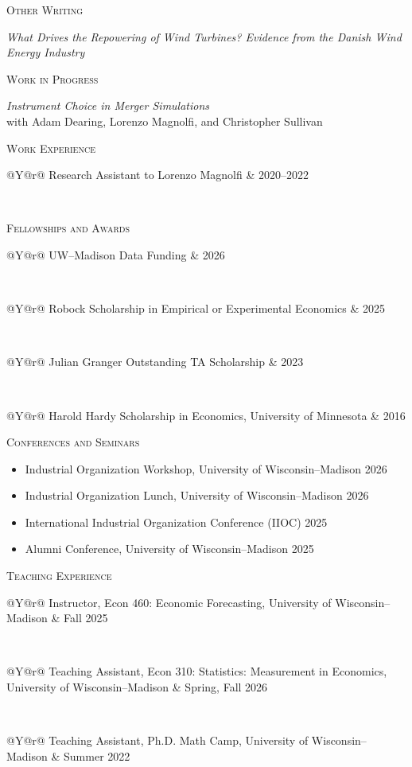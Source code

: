 \documentclass[11pt]{article}
\makeatletter
\newlength{\labelwidthcv}
\newlength{\labelgapcv}
\newlength{\contentwidthcv}
\newcommand{\sectionlabel}[1]{\textsc{#1}}
\newcommand{\vsp}{\vspace{0.20in}}
\newcommand{\papertitle}[1]{\textit{#1}}
\newcommand{\cvblock}[2]{%
  \noindent
  \begin{minipage}[t]{\labelwidthcv}
    \vspace{0pt}\raggedright\sectionlabel{#1}
  \end{minipage}%
  \hspace{\labelgapcv}%
  \begin{minipage}[t]{\contentwidthcv}
    \vspace{0pt}#2
  \end{minipage}\par
}
\newcommand{\datedentry}[2]{%
  \begin{tabularx}{\linewidth}{@{}Y@{\hspace{0.7em}}r@{}}
  #1 & #2
  \end{tabularx}%
}
\makeatother
\begin{document}
\vsp

\cvblock{Other Writing}{%
  \papertitle{What Drives the Repowering of Wind Turbines? Evidence from the Danish Wind Energy Industry}
}

\vsp

\cvblock{Work in Progress}{%
  \papertitle{Instrument Choice in Merger Simulations}\\[-0.01in]
  with Adam Dearing, Lorenzo Magnolfi, and Christopher Sullivan
}

\vsp

\cvblock{Work Experience}{%
  \datedentry{Research Assistant to Lorenzo Magnolfi}{2020--2022}\\[-0.01in]
}

\vsp

\cvblock{Fellowships and Awards}{%
  \datedentry{UW--Madison Data Funding}{2026}\\[-0.025in]
  \datedentry{Robock Scholarship in Empirical or Experimental Economics}{2025}\\[-0.025in]
  \datedentry{Julian Granger Outstanding TA Scholarship}{2023}\\[-0.025in]
  \datedentry{Harold Hardy Scholarship in Economics, University of Minnesota}{2016}
}

\vsp

\cvblock{Conferences and Seminars}{%
  \begin{itemize}[leftmargin=1.15em,itemsep=1pt,topsep=3pt,parsep=0pt]
    \item Industrial Organization Workshop, University of Wisconsin--Madison \hfill 2026
    \item Industrial Organization Lunch, University of Wisconsin--Madison \hfill 2026
    \item International Industrial Organization Conference (IIOC) \hfill 2025
    \item Alumni Conference, University of Wisconsin--Madison \hfill 2025
  \end{itemize}
}

\vsp

\cvblock{Teaching Experience}{%
  \datedentry{Instructor, Econ 460: Economic Forecasting, University of Wisconsin--Madison}{Fall 2025}\\[-0.025in]
  \datedentry{Teaching Assistant, Econ 310: Statistics: Measurement in Economics, University of Wisconsin--Madison}{Spring, Fall 2026}\\[-0.025in]
  \datedentry{Teaching Assistant, Ph.D. Math Camp, University of Wisconsin--Madison}{Summer 2022}
}

\vsp
\end{document}
